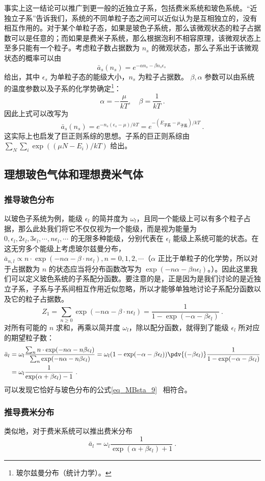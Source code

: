 事实上这一结论可以推广到更一般的近独立子系，包括费米系统和玻色系统。“近独立子系”告诉我们，系统的不同单粒子态之间可以近似认为是互相独立的，没有相互作用的。对于某个单粒子态，如果是玻色子系统，那么该微观状态的粒子占据数可以是任意的；而如果是费米子系统，那么根据泡利不相容原理，该微观状态上至多只能有一个粒子。考虑粒子数占据数为 $n_s$ 的微观状态，那么子系出于该微观状态的概率可以由 
\begin{equation}
\bar a_s(n_s) =  e^{-\alpha n_s-\beta n_s \epsilon_s}~
\end{equation}
给出，其中 $\epsilon_s$ 为单粒子态的能级大小，$n_s$ 为粒子占据数。
$\beta,\alpha$ 参数可以由系统的温度参数以及子系的化学势确定\footnote{玻尔兹曼分布（统计力学）。}：
\begin{equation}
\alpha=-\frac{\mu}{kT},\quad \beta=\frac{1}{kT}~.
\end{equation}
因此上式可以改写为
\begin{equation}
\bar a_s(n_s)= e^{-n_s(\epsilon_s-\mu)/kT}= e^{-(E_\text{子系}-\mu_\text{子系})/kT}~.
\end{equation}
这实际上也启发了巨正则系综的思想。子系的巨正则系综由 $\sum_N \sum_i \exp((\mu N-E_i)/kT)$ 给出。

\subsection{理想玻色气体和理想费米气体}
\subsubsection{推导玻色分布}
以玻色子系统为例，能级 $\epsilon_l$ 的简并度为 $\omega_l$，且同一个能级上可以有多个粒子占据，那么此处我们将它不仅仅视为一个能级，而是视为能量为 $0,\epsilon_l,2\epsilon_l,3\epsilon_l,\cdots, n\epsilon_l,\cdots$ 的无限多种能级，分别代表在 $\epsilon_l$ 能级上系统可能的状态。在这无穷多个能级上考虑玻尔兹曼分布，$\bar{a}_{n,l} \propto n\cdot \exp(-n\alpha-\beta\cdot n\epsilon_l),n=0,1,2,\cdots $（$\alpha$ 正比于单粒子的化学势，所以对于占据数为 $n$ 的状态应当将分布函数改写为 $\exp(-n\alpha-\beta n\epsilon_l)$。）。因此这里我们可以定义玻色系统的子系配分函数。要注意的是，正是因为是我们讨论的是近独立子系，子系与子系间相互作用近似忽略，所以才能够单独地讨论子系配分函数以及它的粒子占据数。
\begin{equation}
Z_1=\sum_{n\ge 0} \exp(-n\alpha-\beta\cdot n\epsilon_l)=\frac{1}{1-\exp(-\alpha-\beta\epsilon_l)}~.
\end{equation}
对所有可能的 $n$ 求和，再乘以简并度 $\omega_l$，除以配分函数，就得到了能级 $\epsilon_l$ 所对应的期望粒子数：
\begin{equation}\label{eq_depsys_1}
\begin{aligned}
\bar a_l&=\omega_l \frac{\sum_n n\cdot \exp(-n\alpha-n\beta\epsilon_l)}{\sum_n \exp(-n\alpha-n\beta\epsilon_l)}=\omega_l (1-\exp(-\alpha-\beta\epsilon_l)) \pdv{(-\beta\epsilon_l)} \frac{1}{1-\exp(-\alpha-\beta\epsilon_l)}\\
&=\omega_l \frac{1}{\exp(\alpha+\beta\epsilon_l)-1}~.
\end{aligned}
\end{equation}
可以发现它恰好与玻色分布的公式\autoref{eq_MBsta_9}~ 相符合。
\subsubsection{推导费米分布}
类似地，对于费米系统可以推出费米分布
\begin{equation}
\bar a_l=\omega_l \frac{1}{\exp(\alpha+\beta\epsilon_l)+1}~.
\end{equation}
